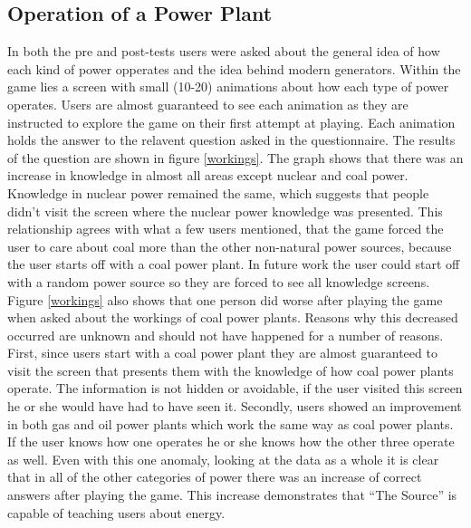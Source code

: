 \documentclass[msc,oneside]{ubcthesis}%
\begin{document}
\subsection{Operation of a Power Plant}
    In both the pre and post-tests users were asked about the general idea of how each kind of power opperates and the idea behind modern generators. Within the game lies a screen with small (10-20) animations about how each type of power operates. Users are almost guaranteed to see each animation as they are instructed to explore the game on their first attempt at playing. Each animation holds the answer to the relavent question asked in the questionnaire. The results of the question are shown in figure \ref{workings}. The graph shows that there was an increase in knowledge in almost all areas except nuclear and coal power. Knowledge in nuclear power remained the same, which suggests that people didn't visit the screen where the nuclear power knowledge was presented. This relationship agrees with what a few users mentioned, that the game forced the user to care about coal more than the other non-natural power sources, because the user starts off with a coal power plant. In future work the user could start off with a random power source so they are forced to see all knowledge screens. Figure \ref{workings} also shows that one person did worse after playing the game when asked about the workings of coal power plants. Reasons why this decreased occurred are unknown and should not have happened for a number of reasons. First, since users start with a coal power plant they are almost guaranteed to visit the screen that presents them with the knowledge of how coal power plants operate. The information is not hidden or avoidable, if the user visited this screen he or she would have had to have seen it. Secondly, users showed an improvement in both gas and oil power plants which work the same way as coal power plants. If the user knows how one operates he or she knows how the other three operate as well. 
    Even with this one anomaly, looking at the data as a whole it is clear that in all of the other categories of power there was an increase of correct answers after playing the game. This increase demonstrates that ``The Source'' is capable of teaching users about energy. 
\end{document}

